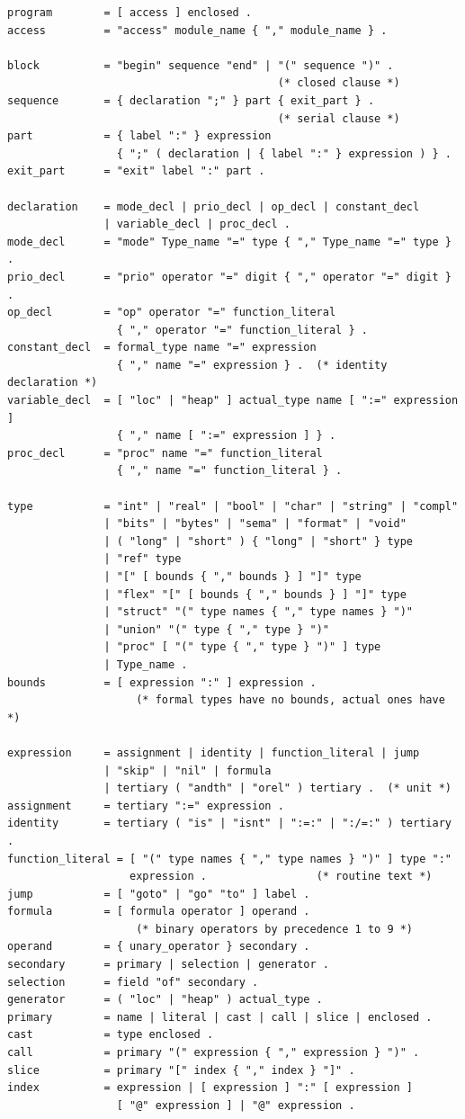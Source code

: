 \begin{lstlisting}[language={},basicstyle=\ttfamily\footnotesize]
program        = [ access ] enclosed .
access         = "access" module_name { "," module_name } .

block          = "begin" sequence "end" | "(" sequence ")" .
                                          (* closed clause *)
sequence       = { declaration ";" } part { exit_part } .
                                          (* serial clause *)
part           = { label ":" } expression
                 { ";" ( declaration | { label ":" } expression ) } .
exit_part      = "exit" label ":" part .

declaration    = mode_decl | prio_decl | op_decl | constant_decl
               | variable_decl | proc_decl .
mode_decl      = "mode" Type_name "=" type { "," Type_name "=" type } .
prio_decl      = "prio" operator "=" digit { "," operator "=" digit } .
op_decl        = "op" operator "=" function_literal
                 { "," operator "=" function_literal } .
constant_decl  = formal_type name "=" expression
                 { "," name "=" expression } .  (* identity declaration *)
variable_decl  = [ "loc" | "heap" ] actual_type name [ ":=" expression ]
                 { "," name [ ":=" expression ] } .
proc_decl      = "proc" name "=" function_literal
                 { "," name "=" function_literal } .

type           = "int" | "real" | "bool" | "char" | "string" | "compl"
               | "bits" | "bytes" | "sema" | "format" | "void"
               | ( "long" | "short" ) { "long" | "short" } type
               | "ref" type
               | "[" [ bounds { "," bounds } ] "]" type
               | "flex" "[" [ bounds { "," bounds } ] "]" type
               | "struct" "(" type names { "," type names } ")"
               | "union" "(" type { "," type } ")"
               | "proc" [ "(" type { "," type } ")" ] type
               | Type_name .
bounds         = [ expression ":" ] expression .
                    (* formal types have no bounds, actual ones have *)

expression     = assignment | identity | function_literal | jump
               | "skip" | "nil" | formula
               | tertiary ( "andth" | "orel" ) tertiary .  (* unit *)
assignment     = tertiary ":=" expression .
identity       = tertiary ( "is" | "isnt" | ":=:" | ":/=:" ) tertiary .
function_literal = [ "(" type names { "," type names } ")" ] type ":"
                   expression .                 (* routine text *)
jump           = [ "goto" | "go" "to" ] label .
formula        = [ formula operator ] operand .
                    (* binary operators by precedence 1 to 9 *)
operand        = { unary_operator } secondary .
secondary      = primary | selection | generator .
selection      = field "of" secondary .
generator      = ( "loc" | "heap" ) actual_type .
primary        = name | literal | cast | call | slice | enclosed .
cast           = type enclosed .
call           = primary "(" expression { "," expression } ")" .
slice          = primary "[" index { "," index } "]" .
index          = expression | [ expression ] ":" [ expression ]
                 [ "@" expression ] | "@" expression .


\end{lstlisting}
